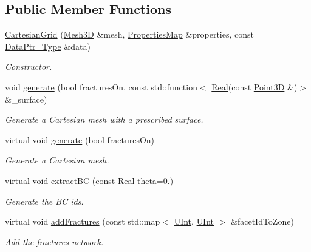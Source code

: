 \subsection*{Public Member Functions}
\begin{DoxyCompactItemize}
\item 
\hyperlink{classFVCode3D_1_1CartesianGrid_a0b6893665344152a46600ecfb4681b31}{Cartesian\+Grid} (\hyperlink{classFVCode3D_1_1Mesh3D}{Mesh3D} \&mesh, \hyperlink{classFVCode3D_1_1PropertiesMap}{Properties\+Map} \&properties, const \hyperlink{namespaceFVCode3D_a3d19a370a98afe491a9e17a646a9c56f}{Data\+Ptr\+\_\+\+Type} \&data)
\begin{DoxyCompactList}\small\item\em Constructor. \end{DoxyCompactList}\item 
void \hyperlink{classFVCode3D_1_1CartesianGrid_afdc4d12f34f9bf46db17ec8765e6875f}{generate} (bool fractures\+On, const std\+::function$<$ \hyperlink{namespaceFVCode3D_a40c1f5588a248569d80aa5f867080e83}{Real}(const \hyperlink{classFVCode3D_1_1Point3D}{Point3D} \&)$>$ \&\+\_\+surface)
\begin{DoxyCompactList}\small\item\em Generate a Cartesian mesh with a prescribed surface. \end{DoxyCompactList}\item 
virtual void \hyperlink{classFVCode3D_1_1CartesianGrid_ab78b5759c0b421c8a3ab350eb79637ac}{generate} (bool fractures\+On)
\begin{DoxyCompactList}\small\item\em Generate a Cartesian mesh. \end{DoxyCompactList}\item 
virtual void \hyperlink{classFVCode3D_1_1CartesianGrid_a8e96033c8f0f0f7b326bba2a87a20c41}{extract\+BC} (const \hyperlink{namespaceFVCode3D_a40c1f5588a248569d80aa5f867080e83}{Real} theta=0.)
\begin{DoxyCompactList}\small\item\em Generate the BC ids. \end{DoxyCompactList}\item 
virtual void \hyperlink{classFVCode3D_1_1CartesianGrid_ad331317a639d3441d6fa7707b78dfc67}{add\+Fractures} (const std\+::map$<$ \hyperlink{namespaceFVCode3D_a4bf7e328c75d0fd504050d040ebe9eda}{U\+Int}, \hyperlink{namespaceFVCode3D_a4bf7e328c75d0fd504050d040ebe9eda}{U\+Int} $>$ \&facet\+Id\+To\+Zone)
\begin{DoxyCompactList}\small\item\em Add the fractures network. \end{DoxyCompactList}\item 

\end{DoxyCompactItemize}
